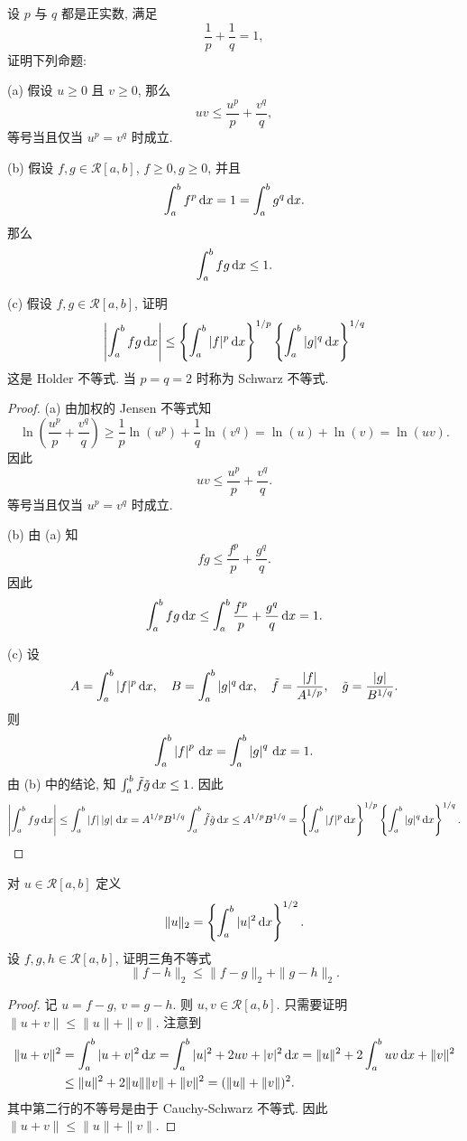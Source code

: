 ﻿\documentclass{article}
\begin{document}
\begin{problem}
设 $p$ 与 $q$ 都是正实数, 满足
\[ \frac{1}{p} + \frac{1}{q} = 1, \]
证明下列命题:

(a) 假设 $u \ge 0$ 且 $v \ge 0$, 那么
\[ uv \le \frac{u^p}{p} + \frac{v^q}{q}, \]
等号当且仅当 $u^p = v^q$ 时成立.

(b) 假设 $f, g \in \mathscr{R}[a, b]$, $f \ge 0, g \ge 0$, 并且
\[ \int_a^b f^p \,\mathrm{d} x = 1 = \int_a^b g^q \,\mathrm{d} x. \]
那么
\[ \int_a^b fg \,\mathrm{d} x \le 1. \]

(c) 假设 $f, g \in \mathscr{R}[a, b]$, 证明
\[ \left| \int_a^b fg \,\mathrm{d} x \right| \le \left\{ \int_a^b |f|^p \,\mathrm{d} x \right\}^{1/p} \left\{ \int_a^b |g|^q \,\mathrm{d} x \right\}^{1/q} \]
这是 Holder 不等式. 当 $p = q = 2$ 时称为 Schwarz 不等式.
\end{problem}

\begin{proof}
  (a) 由加权的 Jensen 不等式知
  \[ \ln\left( \frac{u^p}{p} + \frac{v^q}{q} \right) \ge \frac{1}{p} \ln(u^p) + \frac{1}{q} \ln(v^q) = \ln(u) + \ln(v) = \ln(uv). \]
  因此
  \[ uv \le \frac{u^p}{p} + \frac{v^q}{q}. \]
  等号当且仅当 $u^p = v^q$ 时成立.

  (b) 由 (a) 知
  \[ fg \le \frac{f^p}{p} + \frac{g^q}{q}. \]
  因此
  \[ \int_a^b fg \,\mathrm{d} x \le \int_a^b \frac{f^p}{p} + \frac{g^q}{q} \,\mathrm{d} x = 1. \]

  (c) 设
  \[ A = \int_a^b |f|^p \,\mathrm{d} x , \quad B = \int_a^b |g|^q \,\mathrm{d} x , \quad \tilde{f}=\frac{\left|f\right|}{A^{1/p}}, \quad \tilde{g}=\frac{\left|g\right|}{B^{1/q}}. \]
  则
  \[ \int_{a}^{b}\left|f\right|^p\,\mathrm{d} x=\int_{a}^{b}\left|g\right|^q\,\mathrm{d} x=1. \]
  由 (b) 中的结论, 知 \( \int_a^b \tilde{f} \tilde{g} \,\mathrm{d} x \le 1 \). 因此
  \[ \left|\int_{a}^{b}fg\,\mathrm{d} x\right|
  \le \int_{a}^{b}\left|f\right|\left|g\right|\,\mathrm{d} x
  = A^{1/p} B^{1/q} \int_{a}^{b}\tilde{f}\tilde{g}\,\mathrm{d} x 
  \le A^{1/p} B^{1/q}
  =\left\{ \int_a^b |f|^p \,\mathrm{d} x \right\}^{1/p} \left\{ \int_a^b |g|^q \,\mathrm{d} x \right\}^{1/q}. \]

\end{proof}



\begin{problem}
对 $u \in \mathscr{R}[a, b]$ 定义
\[ \|u\|_2 = \left\{ \int_a^b |u|^2 \,\mathrm{d} x \right\}^{1/2}. \]
设 $f, g, h \in \mathscr{R}[a, b]$, 证明三角不等式
\[ \|f - h\|_2 \le \|f - g\|_2 + \|g - h\|_2. \]
\end{problem}

\begin{proof}
  记 \( u=f-g \), \( v=g-h \). 则 \( u,v\in\mathscr{R}[a,b] \). 只需要证明 \( \|u+v\|\le\|u\|+\|v\| \). 注意到
  \begin{align*}
    \|u+v\|^2 & = \int_a^b |u+v|^2 \,\mathrm{d} x 
    = \int_a^b |u|^2 + 2uv + |v|^2 \,\mathrm{d} x
    = \|u\|^2 + 2\int_a^b uv \,\mathrm{d} x + \|v\|^2 \\
    & \le \|u\|^2 + 2\|u\|\|v\| + \|v\|^2 = (\|u\|+\|v\|)^2.
  \end{align*}
  其中第二行的不等号是由于 Cauchy-Schwarz 不等式. 因此 \( \|u+v\| \le \|u\| + \|v\| \).
\end{proof}
\end{document}
